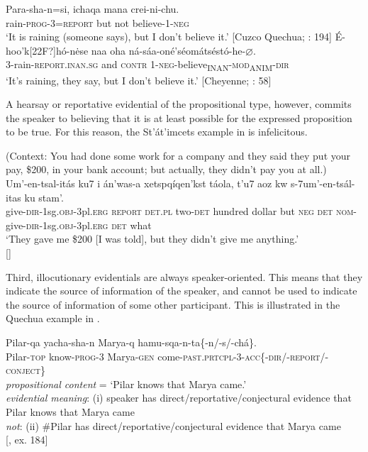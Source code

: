 \ea
\ea \gll Para-sha-n=si,  ichaqa  mana  crei-ni-chu.\\
rain-\textsc{prog}-3=\textsc{report}  but  not  believe-1-\textsc{neg}\\
\glt ‘It is raining (someone says), but I don’t believe it.’ [Cuzco Quechua; \citealt{Faller2002}: 194]
\ex \gll  É-hoo'k[22F?]hó-n\.ese  naa  oha  ná-sáa-oné'séomátséstó-he-⌀.\\
3-rain-\textsc{report}.\textsc{inan.sg}  and  \textsc{contr}  1-\textsc{neg}-believe\textsubscript{INAN}-\textsc{mod\textsubscript{A}}\textsubscript{NIM}-\textsc{dir}\\
\glt ‘It’s raining, they say, but I don’t believe it.’  [Cheyenne; \citealt{Murray2010}: 58]
\z \z


A hearsay or reportative evidential of the propositional type, however, commits the speaker to believing that it is at least possible for the expressed proposition to be true. For this reason, the St’át’imcets example in  is infelicitous.


\ea
(Context: You had done some work for a company and they said they put your pay, \$200, in your bank account; but actually, they didn’t pay you at all.)\\
\gll *Um’-en-tsal-itás  ku7  i  án’was-a  xetspqíqen’kst  táola, t’u7  aoz  kw  s-7um’-en-tsál-itas  ku  stam’.\\
 give-\textsc{dir}-1sg.\textsc{obj}-3pl.\textsc{erg}  \textsc{report}  \textsc{det.pl}  two-\textsc{det}  hundred  dollar but  \textsc{neg}  \textsc{det}  \textsc{nom}-give-\textsc{dir}-1sg.\textsc{obj}-3pl.\textsc{erg}  \textsc{det}  what\\
\glt ‘They gave me \$200 [I was told], but they didn’t give me anything.’\\
   {}[\citealt{Matthewsonetal2007}]
\z


Third, illocutionary evidentials are always speaker-oriented. This means that they indicate the source of information of the speaker, and cannot be used to indicate the source of information of some other participant. This is illustrated in the Quechua example in .


\ea
\gll Pilar-qa  yacha-sha-n  Marya-q  hamu-sqa-n-ta\{-n/-s/-chá\}.\\
Pilar-\textsc{top}  know-\textsc{prog}-3  Marya-\textsc{gen}  come-\textsc{past.prtcpl}-3-\textsc{acc\{-dir}/-\textsc{report}/-\textsc{conject\}}\\
\glt \textit{propositional content} = ‘Pilar knows that Marya came.’\\
\textit{evidential meaning}: (i) speaker has direct/reportative/conjectural evidence that\\
    Pilar knows that Marya came\\
\textit{not}: (ii) \#Pilar has direct/reportative/conjectural evidence that Marya came\\
     {}[\citealt{Faller2002}, ex. 184]
\z


